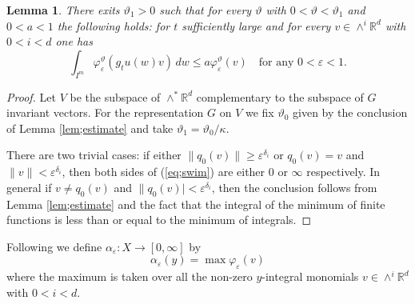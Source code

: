 \documentclass[12pt]{amsart}
\newtheorem{lem}[thm]{Lemma}
\theoremstyle{definition}
\theoremstyle{remark}
\numberwithin{equation}{section}
\begin{document}
\begin{lem}\label{lem;restate}
There exits $\vartheta_1>0$ such that 
for every $\vartheta $ with $0<\vartheta< \vartheta_1$ and $0<a<1$
the following holds: for $t$ sufficiently large and 
 for every  $v\in \wedge ^i\mathbb R^d$ with $0<i<d$ one has
\begin{equation}\label{eq;swim}
\int_{I^m} \varphi_{ \varepsilon }^\vartheta(g_tu(w)v)\, dw\le a\varphi_{ \varepsilon }^\vartheta
(v) \quad \mbox{for any } 0<\varepsilon <1.
\end{equation}
\end{lem}

\begin{proof}
Let $V$ be the   subspace  of $\wedge^* \mathbb R^d$ complementary to the subspace of $G$
invariant 
vectors.
For the representation $G$ on $V$ we fix $\vartheta_0$ given by the conclusion of Lemma \ref{lem;estimate}
and take $\vartheta_1 = \vartheta_0/\kappa$.

There are two trivial cases: 
 if either 
 $\|q_0(v)\|\ge \varepsilon^{\delta _i}$ or    $q_0(v)=v$ and $\|v\|< \varepsilon^{\delta _i} $,
  then both sides of (\ref{eq;swim}) are either $0$ or  $\infty$ respectively.
In general if $v\neq q_0(v)$ and $\|q_0(v)|< \varepsilon ^{\delta_i}$, then
the conclusion  follows from Lemma \ref{lem;estimate}
and the fact that the integral  of the  minimum of finite functions is less than or equal to the minimum of integrals. 
\end{proof}

Following \cite{bq12} we define  $\alpha_{\varepsilon }: X\to [0, \infty]$ by 
\[
\alpha_{ \varepsilon }(y)=\max\varphi_{\varepsilon }(v)
\]
where the maximum is taken over all the non-zero $y$-integral monomials $v\in \wedge ^i\mathbb R^d$
with $0<i<d$. 
\end{document}
